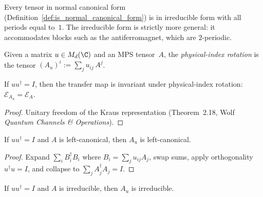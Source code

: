 \begin{remark}\notready
    \label{rem:irr_form_vs_ncf}
    Every tensor in normal canonical form
    (Definition~\ref{def:is_normal_canonical_form})
    is in irreducible form with all periods equal to~$1$.
    The irreducible form is strictly more general: it accommodates
    blocks such as the antiferromagnet, which are $2$-periodic.
\end{remark}

\begin{definition}%
    \label{def:rotate_physical}
    \leanok
    Given a matrix $u \in M_d(\C)$ and an MPS tensor~$A$,
    the \emph{physical-index rotation} is the tensor
    $(A_u)^i := \sum_j u_{ij}\, A^j$.
\end{definition}

\begin{theorem}%
    \label{thm:transfer_map_rotate_physical}
    \leanok
    If $u u^\dagger = I$, then the transfer map is invariant under
    physical-index rotation:
    $\mathcal{E}_{A_u} = \mathcal{E}_A$.
\end{theorem}

\begin{proof}\leanok
    Unitary freedom of the Kraus representation (Theorem~2.18,
    Wolf \emph{Quantum Channels \& Operations}).
\end{proof}

\begin{theorem}%
    \label{thm:left_canonical_rotate_physical}
    \leanok
    If $u u^\dagger = I$ and $A$ is left-canonical, then
    $A_u$ is left-canonical.
\end{theorem}

\begin{proof}\leanok
    Expand $\sum_i B_i^\dagger B_i$ where $B_i = \sum_j u_{ij} A_j$,
    swap sums, apply orthogonality $u^\dagger u = I$, and collapse to
    $\sum_j A_j^\dagger A_j = I$.
\end{proof}

\begin{theorem}%
    \label{thm:irreducible_tensor_rotate_physical}
    \leanok
    If $u u^\dagger = I$ and $A$ is irreducible, then
    $A_u$ is irreducible.
\end{theorem}

